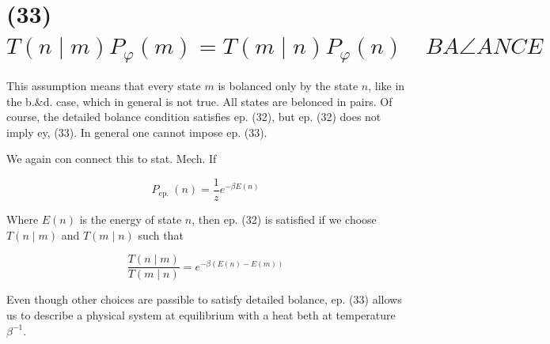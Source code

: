 \documentclass[10pt]{article}
\begin{document}
\section*{(33) $T(n \mid m) P_{\varphi}(m)=T(m \mid n) P_{\varphi}(n) \quad B A \angle A N C E$}
This assumption means that every state $m$ is bolanced only by the state $n$, like in the b.\&d. case, which in general is not true. All states are belonced in pairs. Of course, the detailed bolance condition satisfies ep. (32), but ep. (32) does not imply ey, (33). In general one cannot impose ep. (33).

We again con connect this to stat. Mech. If

$$
P_{\text {ep. }}(n)=\frac{1}{z} e^{-\beta E(n)}
$$

Where $E(n)$ is the energy of state $n$, then ep. (32) is satisfied if we choose $T(n \mid m)$ and $T(m \mid n)$ such that


\begin{equation*}
\frac{T(n \mid m)}{T(m \mid n)}=e^{-\beta(E(n)-E(m))} \tag{33}
\end{equation*}


Even though other choices are passible to satisfy detailed bolance, ep. (33) allows us to describe a physical system at equilibrium with a heat beth at temperature $\beta^{-1}$.
\end{document}
